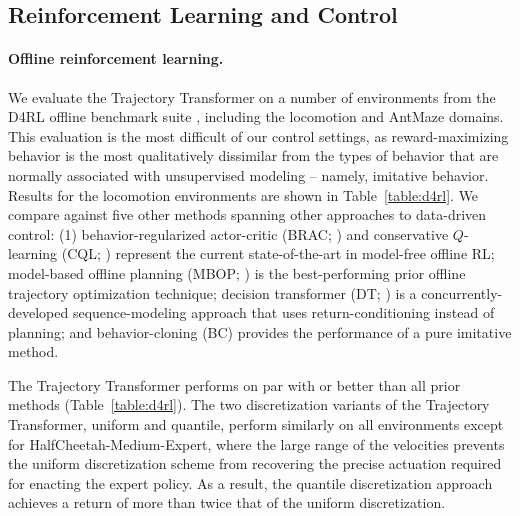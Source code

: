 

\subsection{Reinforcement Learning and Control}
\label{sec:exp_rl}

\paragraph{Offline reinforcement learning.}
We evaluate the Trajectory Transformer on a number of environments from the D4RL offline benchmark suite \citep{fu2020d4rl}, including the locomotion and AntMaze domains.
This evaluation is the most difficult of our control settings, as reward-maximizing behavior is the most qualitatively dissimilar from the types of behavior that are normally associated with unsupervised modeling -- namely, imitative behavior.
Results for the locomotion environments are shown in Table~\ref{table:d4rl}.
We compare against five other methods spanning other approaches to data-driven control: (1) behavior-regularized actor-critic (BRAC; \citealt{wu2019behavior}) and conservative $Q$-learning (CQL; \citealt{kumar2020conservative}) represent the current state-of-the-art in model-free offline RL; model-based offline planning (MBOP; \citealt{argenson2020model}) is the best-performing prior offline trajectory optimization technique; decision transformer (DT; \cite{chen2021decision}) is a concurrently-developed sequence-modeling approach that uses return-conditioning instead of planning; and behavior-cloning (BC) provides the performance of a pure imitative method.

The Trajectory Transformer performs on par with or better than all prior methods (Table~\ref{table:d4rl}).
The two discretization variants of the Trajectory Transformer, uniform and quantile, perform similarly on all environments except for HalfCheetah-Medium-Expert, where the large range of the velocities prevents the uniform discretization scheme from recovering the precise actuation required for enacting the expert policy.
As a result, the quantile discretization approach achieves a return of more than twice that of the uniform discretization.

